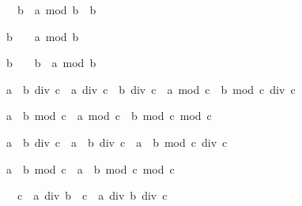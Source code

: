 \begin{isabellebody}
\begin{isamarkuptext}
\begin{isabelle}%
{\isacharhash}{}\ {\isacharless}\ b\ {\isasymLongrightarrow}\ a\ mod\ b\ {\isacharless}\ b%
\end{isabelle}

\begin{isabelle}%
b\ {\isacharless}\ {\isacharhash}{}\ {\isasymLongrightarrow}\ a\ mod\ b\ {\isasymle}\ {\isacharhash}{}%
\end{isabelle}

\begin{isabelle}%
b\ {\isacharless}\ {\isacharhash}{}\ {\isasymLongrightarrow}\ b\ {\isacharless}\ a\ mod\ b%
\end{isabelle}

\begin{isabelle}%
{\isacharparenleft}a\ {\isacharplus}\ b{\isacharparenright}\ div\ c\ {\isacharequal}\ a\ div\ c\ {\isacharplus}\ b\ div\ c\ {\isacharplus}\ {\isacharparenleft}a\ mod\ c\ {\isacharplus}\ b\ mod\ c{\isacharparenright}\ div\ c%
\end{isabelle}

\begin{isabelle}%
{\isacharparenleft}a\ {\isacharplus}\ b{\isacharparenright}\ mod\ c\ {\isacharequal}\ {\isacharparenleft}a\ mod\ c\ {\isacharplus}\ b\ mod\ c{\isacharparenright}\ mod\ c%
\end{isabelle}

\begin{isabelle}%
a\ {\isacharasterisk}\ b\ div\ c\ {\isacharequal}\ a\ {\isacharasterisk}\ {\isacharparenleft}b\ div\ c{\isacharparenright}\ {\isacharplus}\ a\ {\isacharasterisk}\ {\isacharparenleft}b\ mod\ c{\isacharparenright}\ div\ c%
\end{isabelle}

\begin{isabelle}%
a\ {\isacharasterisk}\ b\ mod\ c\ {\isacharequal}\ a\ {\isacharasterisk}\ {\isacharparenleft}b\ mod\ c{\isacharparenright}\ mod\ c%
\end{isabelle}

\begin{isabelle}%
{\isacharhash}{}\ {\isacharless}\ c\ {\isasymLongrightarrow}\ a\ div\ {\isacharparenleft}b\ {\isacharasterisk}\ c{\isacharparenright}\ {\isacharequal}\ a\ div\ b\ div\ c%
\end{isabelle}


\end{isamarkuptext}
\end{isabellebody}
